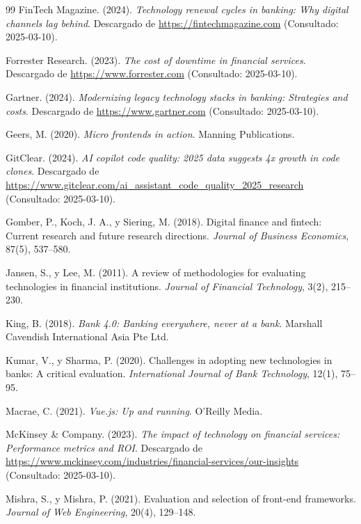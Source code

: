 \begin{thebibliography}{99}
 FinTech Magazine. (2024). \textit{Technology renewal cycles in banking: Why digital channels lag behind}. Descargado de \url{https://fintechmagazine.com} (Consultado: 2025-03-10).

 Forrester Research. (2023). \textit{The cost of downtime in financial services}. Descargado de \url{https://www.forrester.com} (Consultado: 2025-03-10).

 Gartner. (2024). \textit{Modernizing legacy technology stacks in banking: Strategies and costs}. Descargado de \url{https://www.gartner.com} (Consultado: 2025-03-10).

 Geers, M. (2020). \textit{Micro frontends in action}. Manning Publications.

 GitClear. (2024). \textit{AI copilot code quality: 2025 data suggests 4x growth in code clones}. Descargado de \url{https://www.gitclear.com/ai_assistant_code_quality_2025_research} (Consultado: 2025-03-10).

 Gomber, P., Koch, J. A., y Siering, M. (2018). Digital finance and fintech: Current research and future research directions. \textit{Journal of Business Economics}, 87(5), 537--580.

 Jansen, S., y Lee, M. (2011). A review of methodologies for evaluating technologies in financial institutions. \textit{Journal of Financial Technology}, 3(2), 215--230.

 King, B. (2018). \textit{Bank 4.0: Banking everywhere, never at a bank}. Marshall Cavendish International Asia Pte Ltd.

 Kumar, V., y Sharma, P. (2020). Challenges in adopting new technologies in banks: A critical evaluation. \textit{International Journal of Bank Technology}, 12(1), 75--95.

 Macrae, C. (2021). \textit{Vue.js: Up and running}. O'Reilly Media.

 McKinsey \& Company. (2023). \textit{The impact of technology on financial services: Performance metrics and ROI}. Descargado de \url{https://www.mckinsey.com/industries/financial-services/our-insights} (Consultado: 2025-03-10).

 Mishra, S., y Mishra, P. (2021). Evaluation and selection of front-end frameworks. \textit{Journal of Web Engineering}, 20(4), 129--148.


\end{thebibliography}
